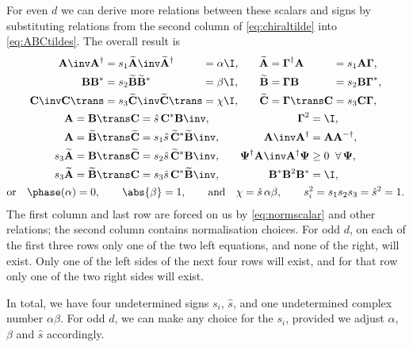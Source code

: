 \documentclass[11pt]{article}
\newcommand{\invd}{^{-\dag}}
\newcommand{\Gammab}{\boldsymbol{\Gamma}}
\newcommand{\A}{\mathbf{A}}
\newcommand{\B}{\mathbf{B}}
\renewcommand{\C}{\mathbf{C}}
\newcommand{\At}{\widetilde{\A}}
\newcommand{\Bt}{\widetilde{\B}}
\newcommand{\Ct}{\widetilde{\C}}
\newcommand{\Psib}{\boldsymbol{\Psi}}
\begin{document}
For even $d$ we can derive more relations between these scalars and signs by substituting relations from the second column of \cref{eq:chiraltilde} into \cref{eq:ABCtildes}.
The overall result is
%
\begin{equation}\label{eq:constnorm}
\begin{gathered}
\begin{alignedat}{4}
  \A\inv \A^\dag &= s_1 \At\inv \At^\dag &
        &= \alpha \I, &
    \At &= \Gammab^\dag \A &
        &= s_1 \A \Gammab,
  \\
  \B \B^\ast &= s_2 \Bt \Bt^\ast &
        &= \beta \I, &
    \Bt &= \Gammab \B &
        &= s_2 \B \Gammab^\ast,
  \\
  \C\inv \C\trans &= s_3 \Ct\inv \Ct\trans &
        &= \chi \I, &\qquad
    \Ct &= \Gammab\trans \C &
        &= s_3 \C \Gammab,
  \\
\end{alignedat}
\\
\begin{alignedat}{3}
  \A &= \B\trans \C &
        &= \hat{s}\, \C^\ast \B\inv, &\qquad
    \Gammab^2 &= \I,
  \\
  \A &= \Bt\trans \Ct &
        &= s_1 \hat{s}\, \Ct^\ast \Bt\inv, &\qquad
    \A\inv \A^\dag &= \A \A\invd,
  \\
  s_3 \At &= \B\trans \Ct &
        &= s_2 \hat{s}\, \Ct^\ast \B\inv, &\qquad
    \Psib^\dag \A\inv \A^\dag \Psib &\geq 0 \;\; \forall \, \Psib,
  \\
  s_3 \At &= \Bt\trans \C &
        &= s_3 \hat{s}\, \C^\ast \Bt\inv, &
    \B^\ast \B^2 \B^\ast &= \I,
\end{alignedat}
\\
  \text{or}\quad
  \phase(\alpha) = 0, \qquad
  \abs{\beta} = 1, \qquad \text{and} \quad
  \chi = \hat{s}\, \alpha \beta, \qquad
  s_i^2 = s_1 s_2 s_3 = \hat{s}^2 = 1.
\end{gathered}
\end{equation}
%
The first column and last row are forced on us by \cref{eq:normscalar} and other relations; the second column contains normalisation choices.
For odd $d$, on each of the first three rows only one of the two left equations, and none of the right, will exist.
Only one of the left sides of the next four rows will exist, and for that row only one of the two right sides will exist.

In total, we have four undetermined signs $s_i$, $\hat{s}$, and one undetermined complex number $\alpha \beta$.
For odd $d$, we can make any choice for the $s_i$, provided we adjust $\alpha$, $\beta$ and $\hat{s}$ accordingly.
\end{document}
